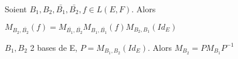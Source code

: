 \documentclass[french]{yLectureNote}
\begin{document}
\begin{proposition}
Soient \(B_1,B_2,\bar{B_1}, \bar{B_2}, f\in L(E,F)\). Alors

\(M_{B_2,\bar{B_2}}(f) = M_{\bar{B_1}, \bar{B_2}}M_{B_1, \bar{B_1}}(f)M_{B_2, B_1}(Id_E)\)
\end{proposition}
\begin{proposition}
\(B_1,B_2\) 2 bases de E, \(P = M_{B_1,B_2}(Id_E)\). Alors \(M_{B_2} = PM_{B_1}P^{-1}\)
\end{proposition}
\end{document}
